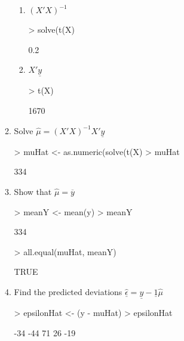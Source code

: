 \documentclass[12pt,a4paper]{paper}
\begin{document}
\begin{enumerate}
\begin{enumerate}
\begin{enumerate}
\item $(X'X)^{-1}$
\begin{Schunk}
\begin{Sinput}
> solve(t(X) %*% X)
\end{Sinput}
\begin{Soutput}
     [,1]
[1,]  0.2
\end{Soutput}
\end{Schunk}
\item $X'\underline{y}$
\begin{Schunk}
\begin{Sinput}
> t(X) %*% y
\end{Sinput}
\begin{Soutput}
     [,1]
[1,] 1670
\end{Soutput}
\end{Schunk}
\end{enumerate}
\item Solve $\hat{\mu} = (X'X)^{-1}X'\underline{y}$
\begin{Schunk}
\begin{Sinput}
> muHat <- as.numeric(solve(t(X) %*% X) %*% X %*% y)
> muHat
\end{Sinput}
\begin{Soutput}
[1] 334
\end{Soutput}
\end{Schunk}
\item Show that $\hat{\mu} = \overline{y}$
\begin{Schunk}
\begin{Sinput}
> meanY <- mean(y)
> meanY
\end{Sinput}
\begin{Soutput}
[1] 334
\end{Soutput}
\begin{Sinput}
> all.equal(muHat, meanY)
\end{Sinput}
\begin{Soutput}
[1] TRUE
\end{Soutput}
\end{Schunk}
\item Find the predicted deviations $\hat{\underline{\epsilon}} = \underline{y} - \underline{1}\hat{\mu}$
\begin{Schunk}
\begin{Sinput}
> epsilonHat <- (y - muHat)
> epsilonHat
\end{Sinput}
\begin{Soutput}
[1] -34 -44  71  26 -19
\end{Soutput}
\end{Schunk}

\end{enumerate}
\end{enumerate}
\end{document}
